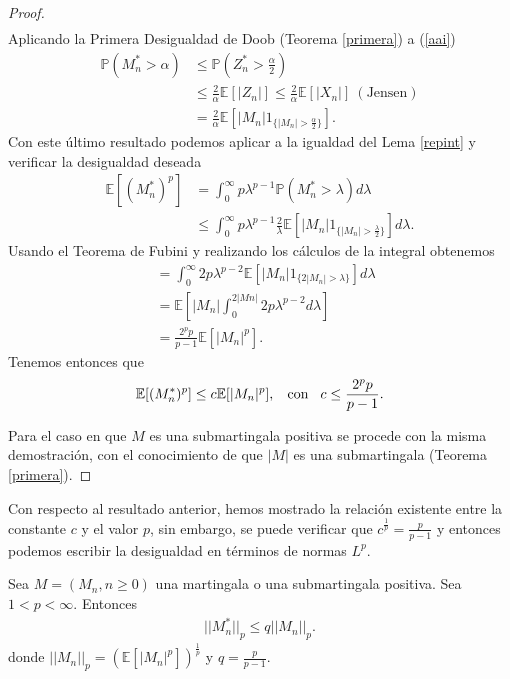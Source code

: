 \begin{proof}
\begin{align}
	\end{align}
	Aplicando la Primera Desigualdad de Doob (Teorema \ref{primera}) a (\ref{aai}) 
	\begin{align*}
		\mathbb{P}(M_n^{*} > \alpha) & \leq \mathbb{P}(Z_n^{*} > \frac{\alpha}{2}) \\
		& \leq \frac{2}{\alpha} \mathbb{E}[|Z_n|] \leq \frac{2}{\alpha} \mathbb{E}[|X_n|] \ (\text{Jensen}) \\
		& = \frac{2}{\alpha} \mathbb{E}[|M_n|1_{\{|M_n| > \frac{\alpha}{2}\}}].
	\end{align*}
	Con este último resultado podemos aplicar a la igualdad del Lema \ref{repint} y verificar la desigualdad deseada
	\begin{align*}
		\mathbb{E}[(M_n^{*})^p] & = \int_0^{\infty} p \lambda^{p-1} \mathbb{P}(M_n^{*} > \lambda) d\lambda \\
		& \leq \int_0^{\infty} p \lambda^{p-1}  \frac{2}{\lambda} \mathbb{E}[|M_n|1_{\{|M_n| > \frac{\lambda}{2}\}}] d\lambda.
	\end{align*}
	Usando el Teorema de Fubini y realizando los cálculos de la integral obtenemos
	\begin{align*}
		& = \int_0^{\infty} 2p \lambda^{p-2} \mathbb{E}[|M_n|1_{\{2|M_n| > \lambda\}} ] d\lambda \\
		& = \mathbb{E}\left[ |M_n| \int_0^{2|Mn|} 2p\lambda^{p-2} d\lambda \right] \\
		& = \frac{2^p p}{p-1} \mathbb{E}[|M_n|^p].
	\end{align*}
	Tenemos entonces que
	\begin{align*}
	\mathbb{E}[(M_n^{*})^p] \leq c\mathbb{E}[|M_n|^p], \hspace{0.3cm} \text{con} \hspace{0.3cm} c \leq \frac{2^p p}{p-1}.
	\end{align*} 
	
Para el caso en que $M$ es una submartingala positiva se procede con la misma demostración, con el conocimiento de que $|M|$ es una submartingala (Teorema \ref{primera}).
\end{proof}

Con respecto al resultado anterior, hemos mostrado la relación existente entre la constante $c$ y el valor $p$, sin embargo, se puede verificar que $c^{\frac{1}{p}} = \frac{p}{p-1}$ y entonces podemos escribir la desigualdad en términos de normas $L^p$.

\begin{theorem}
\label{lp2}
	Sea $M = (M_n, n \geq 0)$ una martingala o una submartingala positiva. Sea $1 < p < \infty$. Entonces
	\begin{align*}
		||M_n^{*}||_p \leq q ||M_n||_p.
	\end{align*}
donde $||M_n||_p = (\mathbb{E}[|M_n|^p])^{\frac{1}{p}}$ y $q = \frac{p}{p-1} $.
\end{theorem}

